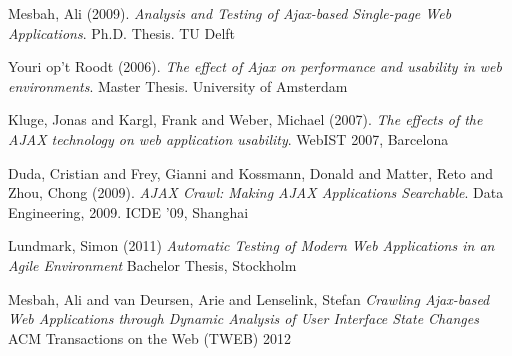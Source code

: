 \documentclass[f,bachelor,binding,twoside,palatino]{WeSTthesis}
\begin{document}
\printglossary

\begin{thebibliography}{9}

  Mesbah, Ali (2009).
  \emph{Analysis and Testing of Ajax-based Single-page Web Applications}.
  Ph.D. Thesis. TU Delft

  Youri op't Roodt (2006).
  \emph{The effect of Ajax on performance and usability in web environments}.
  Master Thesis. University of Amsterdam

  Kluge, Jonas and Kargl, Frank and Weber, Michael (2007).
  \emph{The effects of the AJAX technology on web application usability}.
  WebIST 2007, Barcelona

  Duda, Cristian and Frey, Gianni and Kossmann, Donald and Matter, Reto and Zhou, Chong (2009).
  \emph{AJAX Crawl: Making AJAX Applications Searchable}.
  Data Engineering, 2009. ICDE '09, Shanghai
  
  Lundmark, Simon (2011)
  \emph{Automatic Testing of Modern Web Applications in an Agile Environment}
  Bachelor Thesis, Stockholm

  Mesbah, Ali and van Deursen, Arie and Lenselink, Stefan
  \emph{Crawling {Ajax}-based Web Applications through Dynamic Analysis of User Interface State Changes}
  ACM Transactions on the Web (TWEB) 2012
  
\end{thebibliography}
\end{document}
